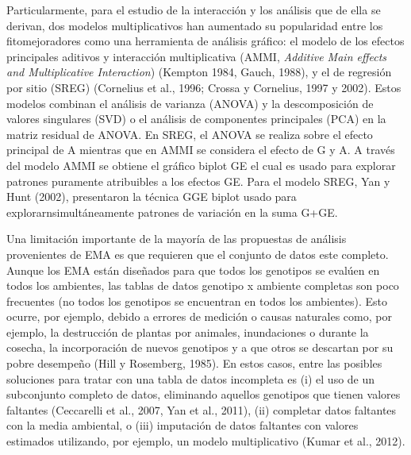 Particularmente, para el estudio de la interacción y los análisis que de ella se derivan, dos modelos multiplicativos han aumentado su popularidad entre los fitomejoradores como una herramienta de análisis gráfico: el modelo de los efectos principales aditivos y interacción multiplicativa (AMMI, \emph{Additive Main effects and Multiplicative Interaction}) (Kempton 1984, Gauch, 1988), y el de regresión por sitio (SREG) (Cornelius et al., 1996; Crossa y Cornelius, 1997 y 2002).  Estos modelos combinan el análisis de varianza (ANOVA) y la descomposición de valores singulares (SVD) o el análisis de componentes principales (PCA) en la matriz residual de ANOVA. En SREG, el ANOVA se realiza sobre el efecto principal de A mientras que en AMMI se considera el efecto de G y A. A través del modelo AMMI se obtiene el gráfico biplot GE el cual es usado para explorar patrones puramente atribuibles a los efectos GE. Para el modelo SREG, Yan y Hunt (2002), presentaron la técnica GGE biplot usado para explorarnsimultáneamente patrones de variación en la suma G+GE.

Una limitación importante de la mayoría de las propuestas de análisis provenientes de EMA es que requieren que el conjunto de datos este completo. Aunque los EMA están diseñados para que todos los genotipos se evalúen en todos los ambientes,  las tablas de datos genotipo x ambiente completas son poco frecuentes (no todos los genotipos se encuentran en todos los ambientes). Esto ocurre, por ejemplo, debido a errores de medición o causas naturales como, por ejemplo, la destrucción de plantas por animales, inundaciones o durante la cosecha, la incorporación de nuevos genotipos y a que otros se descartan por su pobre desempeño (Hill y Rosemberg, 1985). En estos casos, entre las posibles soluciones para tratar con una tabla de datos incompleta es (i) el uso de un subconjunto completo de datos, eliminando aquellos genotipos que tienen valores faltantes (Ceccarelli et al., 2007, Yan et al., 2011), (ii) completar datos faltantes con la media ambiental, o (iii) imputación de datos faltantes con valores estimados utilizando, por ejemplo, un modelo multiplicativo (Kumar et al., 2012). 

